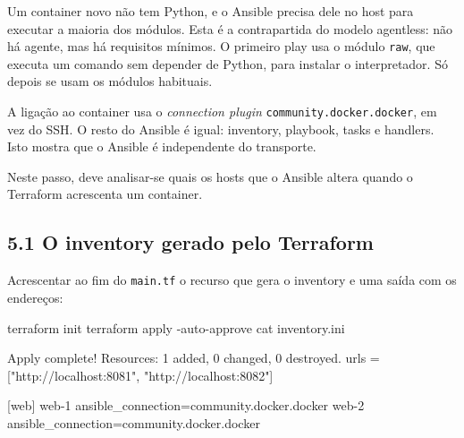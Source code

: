 \documentclass[11pt,a4paper]{article}
\newcommand{\cmd}[1]{\texttt{#1}}
\begin{document}
\begin{teoria}
Um container novo não tem Python, e o Ansible precisa dele no host para executar a maioria dos módulos. Esta é a contrapartida do modelo agentless: não há agente, mas há requisitos mínimos. O primeiro play usa o módulo \cmd{raw}, que executa um comando sem depender de Python, para instalar o interpretador. Só depois se usam os módulos habituais.

A ligação ao container usa o \emph{connection plugin} \cmd{community.docker.docker}, em vez do SSH. O resto do Ansible é igual: inventory, playbook, tasks e handlers. Isto mostra que o Ansible é independente do transporte.

Neste passo, deve analisar-se quais os hosts que o Ansible altera quando o Terraform acrescenta um container.
\end{teoria}

\subsection*{5.1 O inventory gerado pelo Terraform}

Acrescentar ao fim do \cmd{main.tf} o recurso que gera o inventory e uma saída com os endereços:



\begin{terminal}
terraform init
terraform apply -auto-approve
cat inventory.ini
\end{terminal}

\begin{saida}
Apply complete! Resources: 1 added, 0 changed, 0 destroyed.
urls = ["http://localhost:8081", "http://localhost:8082"]

[web]
web-1 ansible_connection=community.docker.docker
web-2 ansible_connection=community.docker.docker
\end{saida}
\end{document}
